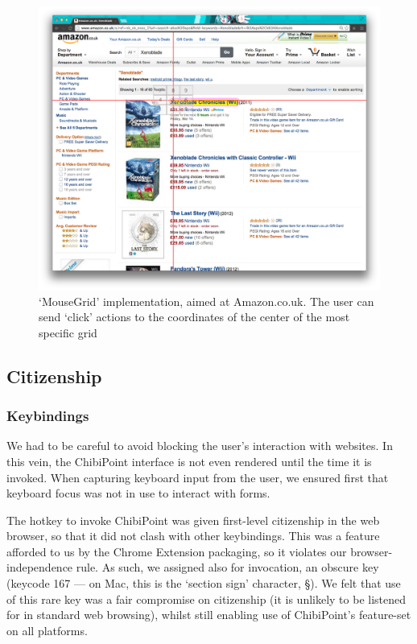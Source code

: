 \documentclass[11pt,openright,a4paper]{report}
\begin{document}
\begin{figure}[ht]
\centering\includegraphics[width=\textwidth]{figures/ImpCrosshairs.png}
\caption{`MouseGrid' implementation, aimed at Amazon.co.uk. The user can send `click' actions to the coordinates of the center of the most specific grid}
\label{fig:impCrosshairs}
\end{figure}
\FloatBarrier

\subsection{Citizenship}
\subsubsection{Keybindings}
We had to be careful to avoid blocking the user's interaction with websites. In this vein, the ChibiPoint interface is not even rendered until the time it is invoked. When capturing keyboard input from the user, we ensured first that keyboard focus was not in use to interact with forms.

The hotkey to invoke ChibiPoint was given first-level citizenship in the web browser, so that it did not clash with other keybindings. This was a feature afforded to us by the Chrome Extension packaging, so it violates our browser-independence rule. As such, we assigned also for invocation, an obscure key (keycode 167 --- on Mac, this is the `section sign' character, \S). We felt that use of this rare key was a fair compromise on citizenship (it is unlikely to be listened for in standard web browsing), whilst still enabling use of ChibiPoint's feature-set on all platforms.
\end{document}
